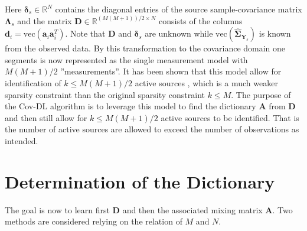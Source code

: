 Here $\boldsymbol{\delta}_s \in \mathbb{R}^{N}$ contains the diagonal entries of the source sample-covariance matrix $\boldsymbol{\Lambda}_s$
and the matrix $\mathbf{D} \in \mathbb{R}^{(M(M+1))/2 \times N}$ consists of the columns $\mathbf{d}_i = \text{vec}(\mathbf{a}_i \mathbf{a}_i^T)$. Note that $\mathbf{D}$ and $\boldsymbol{\delta}_s$ are unknown while $\text{vec}(\widehat{\boldsymbol{\Sigma}}_{\mathbf{Y}_s})$ is known from the observed data.
By this transformation to the covariance domain one segments is now represented as the single measurement model with $M(M+1)/2$ ''measurements''. It has been shown that this model allow for identification of $k\leq M(M+1)/2$ active sources \cite{Pal2015}, which is a much weaker sparsity constraint than the original sparsity constraint $k\leq M$. 
The purpose of the Cov-DL algorithm is to leverage this model to find the dictionary $\textbf{A}$ from $\textbf{D}$ and then still allow for $k\leq M(M+1)/2$ active sources to be identified. That is the number of active sources are allowed to exceed the number of observations as intended.

\section{Determination of the Dictionary}
The goal is now to learn first $\textbf{D}$ and then the associated mixing matrix $\textbf{A}$. Two methods are considered relying on the relation of $M$ and $N$.   





